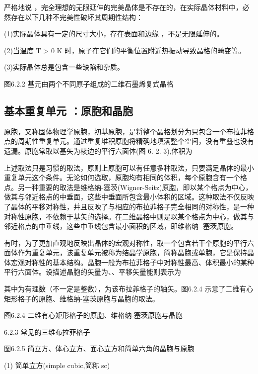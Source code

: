 严格地说 ，完全理想的无限延伸的完美晶体是不存在的，在实际晶体材料中，必然存在以下几种不完美性破坏其周期性结构：

(1)实际晶体具有一定的尺寸大小，存在表面和边缘 ，不是无限延伸的。

(2)当温度 T > 0 K 时，原子在它们的平衡位置附近热振动导致晶格的畸变等。

(3)实际晶体总是包含一些缺陷和杂质。



图6.2.2 基元由两个不同原子组成的二维石墨烯复式晶格


\subsection{基本重复单元 ：原胞和晶胞}

原胞，又称固体物理学原胞，初基原胞，是将整个晶格划分为只包含一个布拉菲格点的周期性重复单元。通过重复堆积原胞将精确地填满整个空间，没有重叠也没有遗漏。原胞常取以基矢为棱边的平行六面体(图 6. 2. 3),体积为



上述取法只是习惯的取法，原则上原胞可以有任意多种取法，只要满足晶体的最小重复单元这个条件。无论如何选取，原胞均有相同的体积，每个原胞含有一个格点。另一种重要的取法是维格纳-塞茨(Wigner-Seitz)原胞，即以某个格点为中心，做其与邻近格点的中垂面，这些中垂面所包含最小体积的区域。这种取法不仅反映了晶体的平移对称性，并且反映了与相应的布拉菲格子完全相同的对称性，是一种对称性原胞，不依赖于基矢的选择。在二维晶格中则是以某个格点为中心，做其与邻近格点的中垂线，这些中垂线包含最小面积的区域，即维格纳 -塞茨原胞。



有时，为了更加直观地反映出晶体的宏观对称性，取一个包含若干个原胞的平行六面体作为重复单元，该重复单元被称为结晶学原胞，简称晶胞或单胞，它是保持晶体宏观对称性的基本结构。晶胞一般为布拉菲格子中对称性最高、体积最小的某种平行六面体。设描述晶胞的矢量为、、平移矢量能则表示为



其中为有理数（不一定是整数），为该布拉菲格子的轴矢。图6.2.4 示意了二维有心矩形格子的原胞、维格纳-塞茨原胞与晶胞的取法。



图6.2.4 二维有心矩形格子的原胞、维格纳-塞茨原胞与晶胞

6.2.3 常见的三维布拉菲格子



图6.2.5 简立方、体心立方、面心立方和简单六角的晶胞与原胞

(1) 简单立方(simple cubic,简称 sc)

